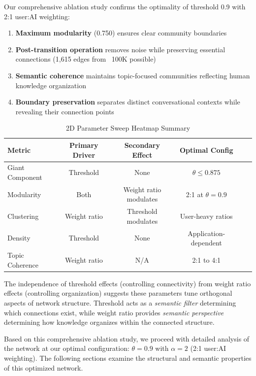 \documentclass{svproc}
\begin{document}
Our comprehensive ablation study confirms the optimality of threshold 0.9 with 2:1 user:AI weighting:

\begin{enumerate}
    \item \textbf{Maximum modularity} (0.750) ensures clear community boundaries
    \item \textbf{Post-transition operation} removes noise while preserving essential connections (1,615 edges from ~100K possible)
    \item \textbf{Semantic coherence} maintains topic-focused communities reflecting human knowledge organization
    \item \textbf{Boundary preservation} separates distinct conversational contexts while revealing their connection points
\end{enumerate}

\begin{table}[h]
\centering
\caption{2D Parameter Sweep Heatmap Summary}
\label{tab:2d_summary}
\begin{tabular}{lccccc}
\toprule
\textbf{Metric} & \textbf{Primary Driver} & \textbf{Secondary Effect} & \textbf{Optimal Config} \\
\midrule
Giant Component & Threshold & None & $\theta \leq 0.875$ \\
Modularity & Both & Weight ratio modulates & 2:1 at $\theta=0.9$ \\
Clustering & Weight ratio & Threshold modulates & User-heavy ratios \\
Density & Threshold & None & Application-dependent \\
Topic Coherence & Weight ratio & N/A & 2:1 to 4:1 \\
\bottomrule
\end{tabular}
\end{table}

The independence of threshold effects (controlling connectivity) from weight ratio effects (controlling organization) suggests these parameters tune orthogonal aspects of network structure. Threshold acts as a \emph{semantic filter} determining which connections exist, while weight ratio provides \emph{semantic perspective} determining how knowledge organizes within the connected structure.

Based on this comprehensive ablation study, we proceed with detailed analysis of the network at our optimal configuration: $\theta = 0.9$ with $\alpha = 2$ (2:1 user:AI weighting). The following sections examine the structural and semantic properties of this optimized network.
\end{document}
